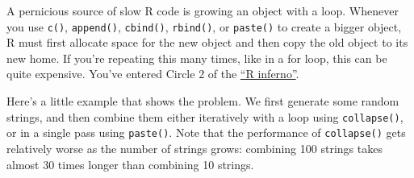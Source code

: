 
A pernicious source of slow R code is growing an object with a loop.
Whenever you use \texttt{c()}, \texttt{append()}, \texttt{cbind()},
\texttt{rbind()}, or \texttt{paste()} to create a bigger object, R must
first allocate space for the new object and then copy the old object to
its new home. If you're repeating this many times, like in a for loop,
this can be quite expensive. You've entered Circle 2 of the
\href{http://www.burns-stat.com/pages/Tutor/R_inferno.pdf}{``R
inferno''}. 

Here's a little example that shows the problem. We first generate some
random strings, and then combine them either iteratively with a loop
using \texttt{collapse()}, or in a single pass using \texttt{paste()}.
Note that the performance of \texttt{collapse()} gets relatively worse
as the number of strings grows: combining 100 strings takes almost 30
times longer than combining 10 strings. 

\begin{Shaded}
\begin{Highlighting}[]
\StringTok{ }
  \NormalTok{(}\NormalTok{, } \NormalTok{), } \NormalTok{)}
\NormalTok{\}}
\StringTok{ }\NormalTok{(}\NormalTok{, }\NormalTok{())}
\StringTok{ }\NormalTok{(}\NormalTok{, }\NormalTok{())}

\StringTok{ }
    \StringTok{ }
  \NormalTok{\}}
\NormalTok{\}}

\NormalTok{(}
   
   
    \NormalTok{),}
    \NormalTok{)}
\NormalTok{)}
\end{Highlighting}
\end{Shaded}

